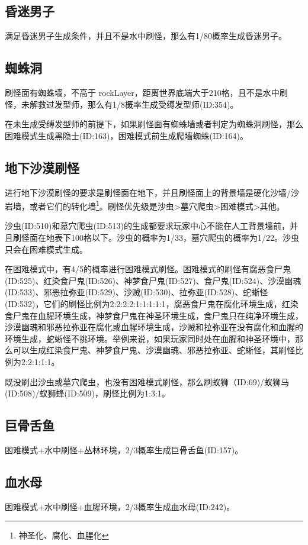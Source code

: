 \subsection{昏迷男子}
满足昏迷男子生成条件，并且不是水中刷怪，那么有1/80概率生成昏迷男子。

\subsection{蜘蛛洞}
刷怪面有蜘蛛墙，不高于 rockLayer，距离世界底端大于210格，且不是水中刷怪，未解救过发型师，那么有1/8概率生成受缚发型师(ID:354)。

在未生成受缚发型师的前提下，如果刷怪面有蜘蛛墙或者判定为蜘蛛洞刷怪，那么困难模式生成黑隐士(ID:163)，困难模式前生成爬墙蜘蛛(ID:164)。

\subsection{地下沙漠刷怪}
进行地下沙漠刷怪的要求是刷怪面在地下，并且刷怪面上的背景墙是硬化沙墙/沙岩墙，或者它们的转化墙\footnote{神圣化、腐化、血腥化}。刷怪优先级是沙虫>墓穴爬虫>困难模式>其他。

沙虫(ID:510)和墓穴爬虫(ID:513)的生成都要求玩家中心不能在人工背景墙前，并且刷怪面在地表下100格以下。沙虫的概率为1/33，墓穴爬虫的概率为1/22。沙虫只会在困难模式生成。

在困难模式中，有4/5的概率进行困难模式刷怪。困难模式的刷怪有腐恶食尸鬼(ID:525)、红染食尸鬼(ID:526)、神梦食尸鬼(ID:527)、食尸鬼(ID:524)、沙漠幽魂(ID:533)、邪恶拉弥亚(ID:529)、沙贼(ID:530)、拉弥亚(ID:528)、蛇蜥怪(ID:532)，它们的刷怪比例为2:2:2:2:1:1:1:1:1，腐恶食尸鬼在腐化环境生成，红染食尸鬼在血腥环境生成，神梦食尸鬼在神圣环境生成，食尸鬼只在纯净环境生成，沙漠幽魂和邪恶拉弥亚在腐化或血腥环境生成，沙贼和拉弥亚在没有腐化和血腥的环境生成，蛇蜥怪不挑环境。举例来说，如果玩家同时处在血腥和神圣环境中，那么可以生成红染食尸鬼、神梦食尸鬼、沙漠幽魂、邪恶拉弥亚、蛇蜥怪，其刷怪比例为2:2:1:1:1。

既没刷出沙虫或墓穴爬虫，也没有困难模式刷怪，那么刷蚁狮（ID:69)/蚁狮马(ID:508)/蚁狮蜂(ID:509)，刷怪比例为1:3:1。

\subsection{巨骨舌鱼}
困难模式+水中刷怪+丛林环境，2/3概率生成巨骨舌鱼(ID:157)。

\subsection{血水母}
困难模式+水中刷怪+血腥环境，2/3概率生成血水母(ID:242)。

